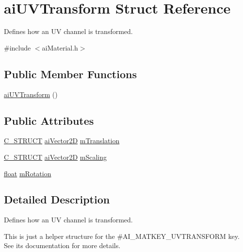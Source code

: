 \hypertarget{structai_u_v_transform}{\section{ai\-U\-V\-Transform Struct Reference}
\label{structai_u_v_transform}
}


Defines how an U\-V channel is transformed.  




{\ttfamily \#include $<$ai\-Material.\-h$>$}

\subsection*{Public Member Functions}
\begin{DoxyCompactItemize}
\item 
\hyperlink{structai_u_v_transform_a8d8fe3de479933ab7fc0e55fc25e51b9}{ai\-U\-V\-Transform} ()
\end{DoxyCompactItemize}
\subsection*{Public Attributes}
\begin{DoxyCompactItemize}
\item 
\hyperlink{ai_defines_8h_ab51df4230ceb602bbc1bc109c432a6a0}{C\-\_\-\-S\-T\-R\-U\-C\-T} \hyperlink{structai_vector2_d}{ai\-Vector2\-D} \hyperlink{structai_u_v_transform_a8c7f35959aa342bf0cef670246fbb813}{m\-Translation}
\item 
\hyperlink{ai_defines_8h_ab51df4230ceb602bbc1bc109c432a6a0}{C\-\_\-\-S\-T\-R\-U\-C\-T} \hyperlink{structai_vector2_d}{ai\-Vector2\-D} \hyperlink{structai_u_v_transform_a89429a027cbf914e7212e48149a957c8}{m\-Scaling}
\item 
\hyperlink{fmod_8h_aeb841aa4b4b5f444b5d739d865b420af}{float} \hyperlink{structai_u_v_transform_aa8dcf39ccd39f786b3f5f163bd663792}{m\-Rotation}
\end{DoxyCompactItemize}


\subsection{Detailed Description}
Defines how an U\-V channel is transformed. 

This is just a helper structure for the \#\-A\-I\-\_\-\-M\-A\-T\-K\-E\-Y\-\_\-\-U\-V\-T\-R\-A\-N\-S\-F\-O\-R\-M key. See its documentation for more details.

